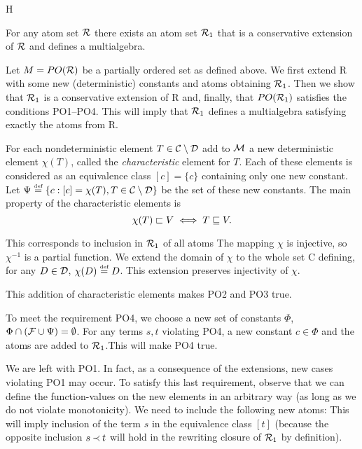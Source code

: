\newITEM H
\begin{THEOREM} \label{th:multialgebra-exists}
For any atom set \(\mbox{$\cal R$}\) there exists an atom set \(\mbox{$\cal R$}_1\) that is a
conservative extension of \(\mbox{$\cal R$}\) and defines a multialgebra.
\end{THEOREM}
\begin{PROOF}
Let \(M=PO(\mbox{$\cal R$})\) be a partially ordered set as defined above. We first extend
\C R with some new (deterministic) constants and atoms obtaining \(\mbox{$\cal R$}_1\). Then
we show that \(\mbox{$\cal R$}_1\) is a conservative extension of \C R and, finally, that
\(PO(\mbox{$\cal R$}_1)\) satisfies the conditions PO1--PO4. This will imply that 
\(\mbox{$\cal R$}_1\) defines a multialgebra satisfying exactly the atoms from \C R.

For each nondeterministic element
\(T\in\mbox{$\cal C$}\setminus \mbox{$\cal D$}\) add to $\mbox{$\cal M$}$ a new deterministic element \(\chi(T)\),
called the {\em characteristic} element for $T$. Each of these elements is 
considered as an
equivalence class \([c]=\{c\}\) containing only one new constant. Let \(\Psi\mathrel{\stackrel{\mbox{\tiny def}}{=}}
\{c: [c]=\chi(T), T\in\mbox{$\cal C$}\setminus\mbox{$\cal D$}\}\) be the set of these new constants. 
The main
property of the characteristic elements is
\begin{equation} \label{eq:charact-constant}
\chi(T)\sqsubset V\iff T\sqsubseteq V.
\end{equation}

This corresponds to inclusion in \(\mbox{$\cal R$}_1\) of all atoms
The mapping \(\chi\) is injective, so \(\chi^{-1}\) is a partial function. We
extend the domain of \(\chi\) to the whole set \C C defining, for any \(D\in\mbox{$\cal D$}\),
\(\chi(D)\mathrel{\stackrel{\mbox{\tiny def}}{=}} D\). This extension preserves injectivity of \(\chi\).

This addition of characteristic elements makes PO2 and PO3 true.

To meet the requirement PO4, we choose a new set of constants \(\Phi\),
\(\Phi\cap({\cal F}\cup\Psi)=\emptyset\). 
For any terms \(s,t\) violating PO4, a new constant \(c\in\Phi\)
and the atoms
are added to \(\mbox{$\cal R$}_1\).This will make PO4 true.

We are left with PO1. In fact, as a consequence of the extensions, new cases
violating PO1 may occur. To satisfy this last requirement, observe that
we can define the function-values on the new elements in an arbitrary way
(as long as we do not violate monotonicity). We need to include the following
 new atoms:
This will imply inclusion of the term $s$ in the
equivalence class $[t]$ (because the opposite inclusion \(s\mathbin{\prec} t\) will hold
in the rewriting closure of \(\mbox{$\cal R$}_1\) by definition).


\end{PROOF}
